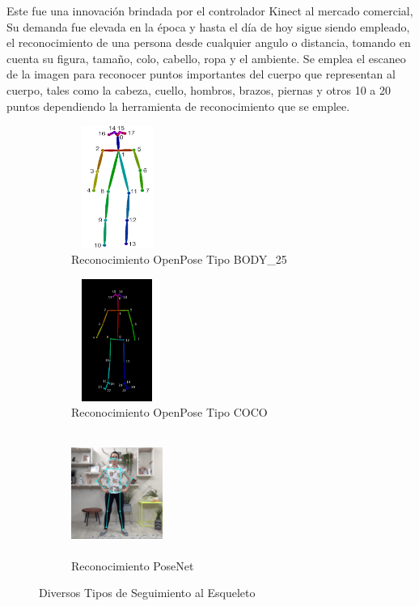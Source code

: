 Este fue una innovación brindada por el controlador Kinect al mercado comercial, Su demanda fue elevada en la época y hasta el día de hoy sigue siendo empleado, el reconocimiento de una persona desde cualquier angulo o distancia, tomando en cuenta su figura, tamaño, colo, cabello, ropa y el ambiente. Se emplea el escaneo de la imagen para reconocer puntos importantes del cuerpo que representan al cuerpo, tales como la cabeza, cuello, hombros, brazos, piernas y otros 10 a 20 puntos dependiendo la herramienta de reconocimiento que se emplee.
\begin{figure}[ht]
	\centering
	\begin{subfigure}{.3\textwidth}
		\centering
		\includegraphics[width=3cm,height=4cm]{./Images/openposet1.png}
		\caption{Reconocimiento OpenPose Tipo BODY\_25}
		\label{open1}
	\end{subfigure}%
	\begin{subfigure}{.3\textwidth}
		\centering
		\includegraphics[width=3cm,height=4cm]{./Images/openposet2.png}
		\caption{Reconocimiento OpenPose Tipo COCO}
		\label{open2}
	\end{subfigure}%
	\begin{subfigure}{.3\textwidth}
		\centering
		\includegraphics[width=3cm,height=4cm]{./Images/posenetexa.jpg}
		\caption{Reconocimiento PoseNet }
		\label{posenet1}
	\end{subfigure}
	\caption{Diversos Tipos de Seguimiento al Esqueleto}
	\label{exampleesqueletotrack}
\end{figure}

